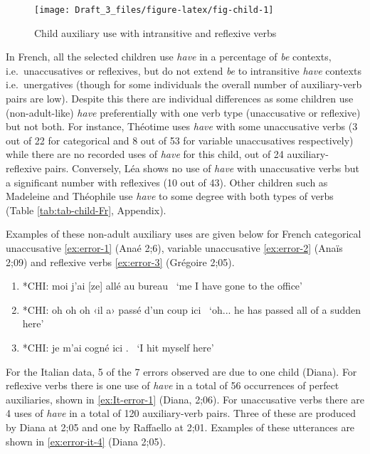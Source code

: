 \documentclass[
  12pt,
]{article}
\begin{document}
\begin{figure}

{\centering \texttt{[image: Draft\_3\_files/figure-latex/fig-child-1]} 

}

\caption{Child auxiliary use with intransitive and reflexive verbs}\label{fig:fig-child}
\end{figure}

In French, all the selected children use \emph{have} in a percentage of \emph{be} contexts, i.e.~unaccusatives or reflexives, but do not extend \emph{be} to intransitive \emph{have} contexts i.e.~unergatives (though for some individuals the overall number of auxiliary-verb pairs are low). Despite this there are individual differences as some children use (non-adult-like) \emph{have} preferentially with one verb type (unaccusative or reflexive) but not both. For instance, Théotime uses \emph{have} with some unaccusative verbs (3 out of 22 for categorical and 8 out of 53 for variable unaccusatives respectively) while there are no recorded uses of \emph{have} for this child, out of 24 auxiliary-reflexive pairs. Conversely, Léa shows no use of \emph{have} with unaccusative verbs but a significant number with reflexives (10 out of 43). Other children such as Madeleine and Théophile use \emph{have} to some degree with both types of verbs (Table \ref{tab:tab-child-Fr}, Appendix).

Examples of these non-adult auxiliary uses are given below for French categorical unaccusative \ref{ex:error-1} (Anaé 2;6), variable unaccusative \ref{ex:error-2} (Anaïs 2;09) and reflexive verbs \ref{ex:error-3} (Grégoire 2;05).

\begin{enumerate}[resume*]
  \item{*CHI:   moi j'ai [ze] allé au bureau \label{ex:error-1}}\newline
        \   `me I have gone to the office'
  \item{*CHI:   oh oh oh ‹il a› passé d'un coup ici \label{ex:error-2}}\newline
        \   `oh... he has passed all of a sudden here'
  \item{*CHI:   je m'ai cogné ici .} \label{ex:error-3}\newline
        \   `I hit myself here'
\end{enumerate}

For the Italian data, 5 of the 7 errors observed are due to one child (Diana). For reflexive verbs there is one use of \emph{have} in a total of 56 occurrences of perfect auxiliaries, shown in \ref{ex:It-error-1} (Diana, 2;06). For unaccusative verbs there are 4 uses of \emph{have} in a total of 120 auxiliary-verb pairs. Three of these are produced by Diana at 2;05 and one by Raffaello at 2;01. Examples of these utterances are shown in \ref{ex:error-it-4} (Diana 2;05).
\end{document}
